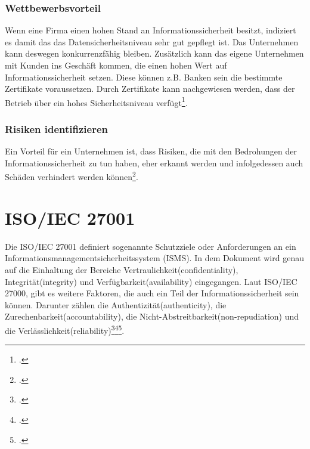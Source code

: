 \subsubsection{Wettbewerbsvorteil}
Wenn eine Firma einen hohen Stand an Informationssicherheit besitzt, indiziert es damit das das Datensicherheitsniveau sehr gut gepflegt ist. Das Unternehmen kann deswegen konkurrenzfähig bleiben. Zusätzlich kann das eigene Unternehmen mit Kunden ins Geschäft kommen, die einen hohen Wert auf Informationssicherheit setzen. Diese können z.B. Banken sein die bestimmte Zertifikate voraussetzen.
Durch Zertifikate kann nachgewiesen werden, dass der Betrieb über ein hohes Sicherheitsniveau verfügt\footcite{Lehrunterlagen-HTL-cloud}.


\subsubsection{Risiken identifizieren}
Ein Vorteil für ein Unternehmen ist, dass Risiken, die mit den Bedrohungen der Informationssicherheit zu tun haben, eher erkannt werden und infolgedessen auch Schäden verhindert werden können\footcite{Lehrunterlagen-HTL-cloud}.


\section{ISO/IEC 27001}
Die ISO/IEC 27001 definiert sogenannte Schutzziele oder Anforderungen an ein Informationsmanagementsicherheitssystem (ISMS). In dem Dokument wird genau auf die Einhaltung der Bereiche Vertraulichkeit(confidentiality), Integrität(integrity) und Verfügbarkeit(availability) eingegangen. Laut ISO/IEC 27000, gibt es weitere Faktoren, die auch ein Teil der Informationssicherheit sein können. Darunter zählen die Authentizität(authenticity), die Zurechenbarkeit(accountability), die Nicht-Abstreitbarkeit(non-repudiation) und die Verlässlichkeit(reliability)\footcite{Lehrunterlagen-HTL-cloud}\footcite{schutzziele-iso27001-bsi}\footcite{schutzziele-iso27001}.


